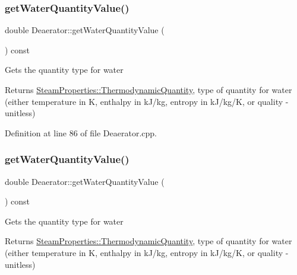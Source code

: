 \subsubsection{\texorpdfstring{get\+Water\+Quantity\+Value()}{getWaterQuantityValue()}\hspace{0.1cm}{\footnotesize\ttfamily [1/3]}}
{\footnotesize\ttfamily double Deaerator\+::get\+Water\+Quantity\+Value (\begin{DoxyParamCaption}{ }\end{DoxyParamCaption}) const}

Gets the quantity type for water \begin{DoxyReturn}{Returns}
\hyperlink{class_steam_properties_ae0294bedf7d178c2d8fb6aed0f62fbff}{Steam\+Properties\+::\+Thermodynamic\+Quantity}, type of quantity for water (either temperature in K, enthalpy in k\+J/kg, entropy in k\+J/kg/K, or quality -\/ unitless) 
\end{DoxyReturn}


Definition at line 86 of file Deaerator.\+cpp.

\mbox{\label{class_deaerator_a9362430fb04802b6f14c9bf09d62a466}} 
\subsubsection{\texorpdfstring{get\+Water\+Quantity\+Value()}{getWaterQuantityValue()}\hspace{0.1cm}{\footnotesize\ttfamily [2/3]}}
{\footnotesize\ttfamily double Deaerator\+::get\+Water\+Quantity\+Value (\begin{DoxyParamCaption}{ }\end{DoxyParamCaption}) const}

Gets the quantity type for water \begin{DoxyReturn}{Returns}
\hyperlink{class_steam_properties_ae0294bedf7d178c2d8fb6aed0f62fbff}{Steam\+Properties\+::\+Thermodynamic\+Quantity}, type of quantity for water (either temperature in K, enthalpy in k\+J/kg, entropy in k\+J/kg/K, or quality -\/ unitless) 
\end{DoxyReturn}
\mbox{\label{class_deaerator_a9362430fb04802b6f14c9bf09d62a466}} 
